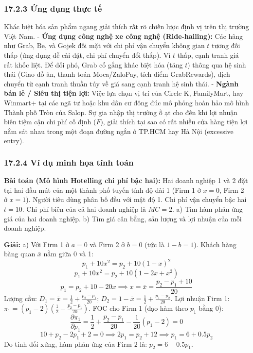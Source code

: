 \documentclass[
]{article}
\begin{document}
\subsubsection{17.2.3 Ứng dụng thực
tế}\label{ux1ee9ng-dux1ee5ng-thux1ef1c-tux1ebf-8}

Khác biệt hóa sản phẩm ngang giải thích rất rõ chiến lược định vị trên
thị trường Việt Nam. - \textbf{Ứng dụng công nghệ xe công nghệ
(Ride-hailing):} Các hãng như Grab, Be, và Gojek đối mặt với chi phí vận
chuyển không gian \(t\) tương đối thấp (ứng dụng dễ cài đặt, chi phí
chuyển đổi thấp). Vì \(t\) thấp, cạnh tranh giá rất khốc liệt. Để đối
phó, Grab cố gắng khác biệt hóa (tăng \(t\)) thông qua hệ sinh thái
(Giao đồ ăn, thanh toán Moca/ZaloPay, tích điểm GrabRewards), dịch
chuyển từ cạnh tranh thuần túy về giá sang cạnh tranh hệ sinh thái. -
\textbf{Ngành bán lẻ / Siêu thị tiện lợi:} Việc lựa chọn vị trí của
Circle K, FamilyMart, hay Winmart+ tại các ngã tư hoặc khu dân cư đông
đúc mô phỏng hoàn hảo mô hình Thành phố Tròn của Salop. Sự gia nhập thị
trường ồ ạt cho đến khi lợi nhuận biên tiệm cận chi phí cố định (\(F\)),
giải thích tại sao có rất nhiều cửa hàng tiện lợi nằm sát nhau trong một
đoạn đường ngắn ở TP.HCM hay Hà Nội (excessive entry).

\subsubsection{17.2.4 Ví dụ minh họa tính
toán}\label{vuxed-dux1ee5-minh-hux1ecda-tuxednh-touxe1n-1}

\textbf{Bài toán (Mô hình Hotelling chi phí bậc hai):} Hai doanh nghiệp
1 và 2 đặt tại hai đầu mút của một thành phố tuyến tính độ dài 1 (Firm 1
ở \(x=0\), Firm 2 ở \(x=1\)). Người tiêu dùng phân bố đều với mật độ 1.
Chi phí vận chuyển bậc hai \(t = 10\). Chi phí biên của cả hai doanh
nghiệp là \(MC = 2\). a) Tìm hàm phản ứng giá của hai doanh nghiệp. b)
Tìm giá cân bằng, sản lượng và lợi nhuận của mỗi doanh nghiệp.

\textbf{Giải:} a) Với Firm 1 ở \(a=0\) và Firm 2 ở \(b=0\) (tức là
\(1-b=1\)). Khách hàng bàng quan \(\bar{x}\) nằm giữa 0 và 1:
\[ p_1 + 10x^2 = p_2 + 10(1-x)^2 \]
\[ p_1 + 10x^2 = p_2 + 10(1 - 2x + x^2) \]
\[ p_1 = p_2 + 10 - 20x \implies x = \bar{x} = \frac{p_2 - p_1 + 10}{20} \]
Lượng cầu: \(D_1 = \bar{x} = \frac{1}{2} + \frac{p_2 - p_1}{20}\);
\(D_2 = 1 - \bar{x} = \frac{1}{2} + \frac{p_1 - p_2}{20}\). Lợi nhuận
Firm 1:
\(\pi_1 = (p_1 - 2)\left(\frac{1}{2} + \frac{p_2 - p_1}{20}\right)\).
FOC cho Firm 1 (đạo hàm theo \(p_1\) bằng 0):
\[ \frac{\partial \pi_1}{\partial p_1} = \frac{1}{2} + \frac{p_2 - p_1}{20} - \frac{1}{20}(p_1 - 2) = 0 \]
\[ 10 + p_2 - 2p_1 + 2 = 0 \implies 2p_1 = p_2 + 12 \implies p_1 = 6 + 0.5p_2 \]
Do tính đối xứng, hàm phản ứng của Firm 2 là: \(p_2 = 6 + 0.5p_1\).
\end{document}
